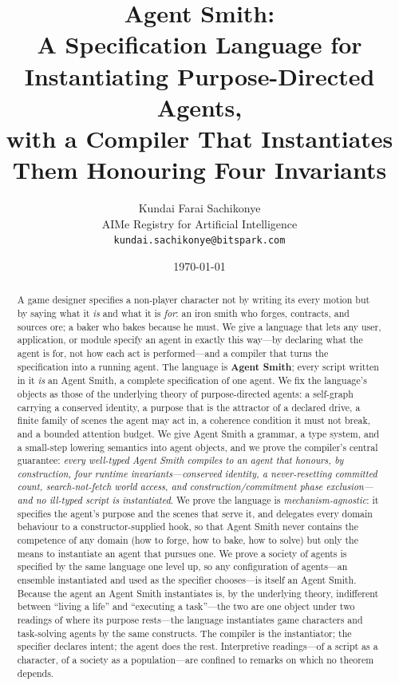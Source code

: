 \documentclass[11pt,twocolumn,a4paper]{article}
\title{\textbf{Agent Smith:\\
A Specification Language for Instantiating Purpose-Directed Agents,\\
with a Compiler That Instantiates Them Honouring Four Invariants}}
\author{Kundai Farai Sachikonye\\[2pt]
\small AIMe Registry for Artificial Intelligence\\
\small \texttt{kundai.sachikonye@bitspark.com}}
\date{\today}
\begin{document}
\maketitle

\begin{abstract}
\noindent
A game designer specifies a non-player character not by writing its every
motion but by saying what it \emph{is} and what it is \emph{for}: an iron
smith who forges, contracts, and sources ore; a baker who bakes because he
must. We give a language that lets any user, application, or module specify
an agent in exactly this way---by declaring what the agent is for, not how
each act is performed---and a compiler that turns the specification into a
running agent. The language is \textbf{Agent Smith}; every script written in
it \emph{is} an Agent Smith, a complete specification of one agent. We fix
the language's objects as those of the underlying theory of purpose-directed
agents: a self-graph carrying a conserved identity, a purpose that is the
attractor of a declared drive, a finite family of scenes the agent may act
in, a coherence condition it must not break, and a bounded attention budget.
We give Agent Smith a grammar, a type system, and a small-step lowering
semantics into agent objects, and we prove the compiler's central guarantee:
\emph{every well-typed Agent Smith compiles to an agent that honours, by
construction, four runtime invariants---conserved identity, a never-resetting
committed count, search-not-fetch world access, and construction/commitment
phase exclusion---and no ill-typed script is instantiated}. We prove the
language is \emph{mechanism-agnostic}: it specifies the agent's purpose and
the scenes that serve it, and delegates every domain behaviour to a
constructor-supplied hook, so that Agent Smith never contains the competence
of any domain (how to forge, how to bake, how to solve) but only the means to
instantiate an agent that pursues one. We prove a society of agents is
specified by the same language one level up, so any configuration of
agents---an ensemble instantiated and used as the specifier chooses---is
itself an Agent Smith. Because the agent an Agent Smith instantiates is, by
the underlying theory, indifferent between ``living a life'' and ``executing
a task''---the two are one object under two readings of where its purpose
rests---the language instantiates game characters and task-solving agents by
the same constructs. The compiler is the instantiator; the specifier
declares intent; the agent does the rest. Interpretive readings---of a script
as a character, of a society as a population---are confined to remarks on
which no theorem depends.
\end{abstract}
\end{document}
